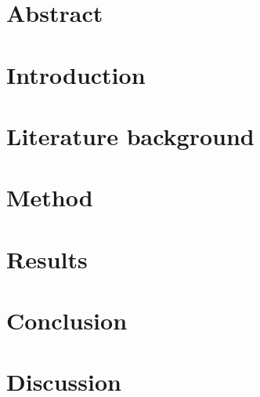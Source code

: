 \documentclass[a4paper, 12pt]{report}
\begin{document}
\setcounter{page}{1}
\pagestyle{plain} 

\chapter*{Abstract}

{
    \tableofcontents
}


\chapter{Introduction}
\label{ch:introduction}


\chapter{Literature background}
\label{ch:literature}


\chapter{Method}
\label{ch:method}


\chapter{Results}
\label{ch:results}


\chapter{Conclusion}
\label{ch:conclusion}


\chapter{Discussion}
\label{ch:discussion}




\end{document}
